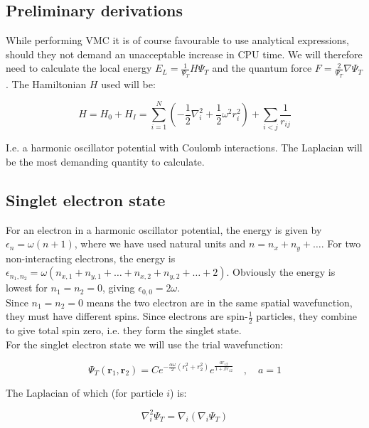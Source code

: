 \documentclass[english, a4paper]{article}
\newcommand{\bm}[1]{\mathbf{#1}}
\begin{document}
	\subsection{Preliminary derivations}
	While performing VMC it is of course favourable to use analytical expressions, should they not demand an unacceptable increase in CPU time. We will therefore need to calculate the local energy $E_L = \frac{1}{\Psi_T}H\Psi_T$ and the quantum force $F = \frac{2}{\Psi_T}\nabla\Psi_T$. The Hamiltonian $H$ used will be:
	
	\begin{equation}
	H = H_0 + H_I = \sum_{i=1}^{N}\left(-\frac{1}{2}\nabla_i^2 + \frac{1}{2}\omega^2r_i^2\right) + \sum_{i<j}\frac{1}{r_{ij}}
	\end{equation}
	
	I.e. a harmonic oscillator potential with Coulomb interactions. The Laplacian will be the most demanding quantity to calculate.
	
	\subsection{Singlet electron state}
	For an electron in a harmonic oscillator potential, the energy is given by $\epsilon_n = \omega(n + 1)$, where we have used natural units and $n = n_x + n_y + \ldots$. For two non-interacting electrons, the energy is $\epsilon_{n_1,n_2} = \omega(n_{x,1} + n_{y,1} + \ldots + n_{x,2} + n_{y,2} + \ldots + 2)$. Obviously the energy is lowest for $n_1 = n_2 = 0$, giving $\epsilon_{0,0} = 2\omega$.\\
	Since $n_1=n_2 = 0$ means the two electron are in the same spatial wavefunction, they must have different spins. 
	Since electrons are spin-$\frac{1}{2}$ particles, they combine to give total spin zero, i.e. they form the singlet state.\\
	
	For the singlet electron state we will use the trial wavefunction:
	
	\begin{equation}
	\Psi_T(\bm{r}_1,\bm{r}_2) = Ce^{-\frac{\alpha\omega}{2}(r_1^2+r_2^2)}e^{\frac{ar_{12}}{1+\beta r_{12}}}\quad,\quad a=1 \label{TwoBodyTrailWavefunction}
	\end{equation}
	
	The Laplacian of which (for particle $i$) is:
	
	\begin{equation}
	\nabla_i^2 \Psi_T = \nabla_i(\nabla_i\Psi_T)
	\end{equation}
	
\end{document}
